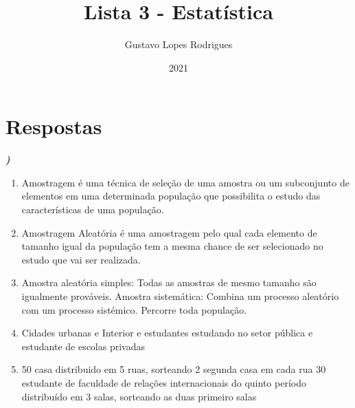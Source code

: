 \documentclass[12pt]{article}
\title{\textbf{Lista 3 - Estatística}}
\author{Gustavo Lopes Rodrigues}
\date{2021}
\newcounter{instn}
\newcommand{\instnum}{\arabic{instn}}
\newcommand{\myline}[1]{
    \emph{\textbf{#1)}}
    \addtocounter{instn}{1}
}
\newenvironment{question}
 {
    \myline{\instnum} 
    }
    {
 }
\begin{document}
    
    \maketitle

    \section*{Respostas}


    \begin{question}
       
        \begin{enumerate}[label={\textbf{\alph*)}}]
            \item 
            Amostragem é uma técnica de seleção de uma amostra ou um subconjunto de elementos em uma determinada
            população que possibilita o estudo das características de uma população.
            \item 
            Amostragem Aleatória é uma amostragem pelo qual cada elemento de tamanho igual da
            população tem a mesma chance de ser selecionado no estudo que vai ser realizada.
            \item 
            Amostra aleatória simples: Todas as amostras de mesmo tamanho são igualmente prováveis.
            Amostra sistemática: Combina um processo aleatório com um processo sistémico. Percorre toda população.
            \item 
            Cidades urbanas e Interior e estudantes estudando no setor pública e estudante de escolas privadas
            \item 
            50 casa distribuido em 5 ruas, sorteando 2 segunda casa em cada rua
            30 estudante de faculdade de relações internacionais do quinto período distribuído em 3 salas, sorteando as duas
            primeiro salas
        \end{enumerate}
    \end{question}
\end{document}
